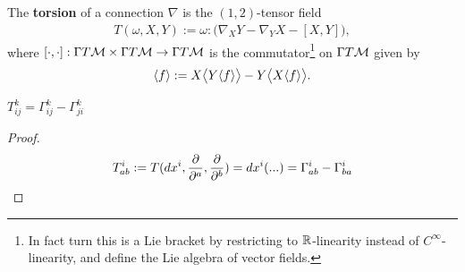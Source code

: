 \documentclass[12pt]{article} %
\begin{document}
\bd[Torsion]
    The \textbf{torsion} of a connection $\nabla$ is the $(1,2)$-tensor field
    \begin{align*}
        T(\omega,X,Y) :=  \omega : \big(\nabla_XY - \nabla_YX - [X,Y]\big),
    \end{align*}
    where $[\cdot,\cdot]: \Gamma T\mathcal{M} \times \Gamma T\mathcal{M} \to \Gamma T\mathcal{M}$ is the commutator\footnote{In fact turn this is a Lie bracket by restricting to $\mathbb{R}$-linearity instead of $C^{\infty}$-linearity, and define the Lie algebra of vector fields.} on $\Gamma T\mathcal{M}$ given by 
    \begin{align*}
        [X,Y]\la f \ra := X\big\la Y\la f\ra \big\ra - Y\big\la X\la f\ra \big\ra.
    \end{align*}
\ed 
\begin{lema}
 $T_{i j}^{k}=\Gamma_{i j}^{k}-\Gamma_{j i}^{k}$
\end{lema}
\begin{proof}
    $$T^i_{ab}:= T(dx^i, \frac{\partial}{\partial^a}, \frac{\partial}{\partial^b})=dx^i(...)=\Gamma^i_{ab}-\Gamma^i_{ba}$$
\end{proof}
\end{document}
